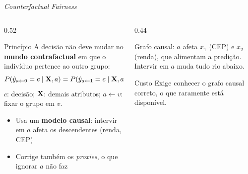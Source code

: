 \documentclass[aspectratio=169,xcolor=dvipsnames]{beamer}
\begin{document}
  \begin{frame}{\textit{Counterfactual Fairness}}
    \begin{columns}[T]
      \begin{column}{0.52\textwidth}
        \begin{block}{Princípio}
          A decisão não deve mudar no \textbf{mundo contrafactual} em que o indivíduo pertence ao outro grupo:
          \[
            P(\hat{y}_{a \leftarrow 0} = c \mid \mathbf{X}, a) = P(\hat{y}_{a \leftarrow 1} = c \mid \mathbf{X}, a)
          \]
          {\scriptsize $c$: decisão; $\mathbf{X}$: demais atributos; $a\leftarrow v$: fixar o grupo em $v$.}
        \end{block}

        \begin{itemize}\small\setlength{\itemsep}{0.1em}
          \item Usa um \textbf{modelo causal}: intervir em $a$ afeta os descendentes (renda, CEP)
          \item Corrige também os \textit{proxies}, o que ignorar $a$ não faz
        \end{itemize}
      \end{column}
      \begin{column}{0.44\textwidth}
        \centering

        \vspace{0.4em}
        \footnotesize Grafo causal: $a$ afeta $x_1$ (CEP) e $x_2$ (renda), que alimentam a predição. Intervir em $a$ muda tudo rio abaixo.

        \vspace{0.3em}
        \begin{alertblock}{\small Custo}
          \small Exige conhecer o grafo causal correto, o que raramente está disponível.
        \end{alertblock}
      \end{column}
    \end{columns}
  \end{frame}
\end{document}

